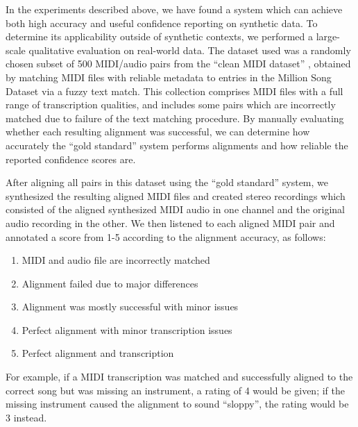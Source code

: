 \documentclass{article}
\begin{document}
In the experiments described above, we have found a system which can achieve both high accuracy and useful confidence reporting on synthetic data.
To determine its applicability outside of synthetic contexts, we performed a large-scale qualitative evaluation on real-world data.
The dataset used was a randomly chosen subset of 500 MIDI/audio pairs from the ``clean MIDI dataset'' \cite{raffel2015large}, obtained by matching MIDI files with reliable metadata to entries in the Million Song Dataset \cite{bertin2011million} via a fuzzy text match.
This collection comprises MIDI files with a full range of transcription qualities, and includes some pairs which are incorrectly matched due to failure of the text matching procedure.
By manually evaluating whether each resulting alignment was successful, we can determine how accurately the ``gold standard'' system performs alignments and how reliable the reported confidence scores are.

After aligning all pairs in this dataset using the ``gold standard'' system, we synthesized the resulting aligned MIDI files and created stereo recordings which consisted of the aligned synthesized MIDI audio in one channel and the original audio recording in the other.
We then listened to each aligned MIDI pair and annotated a score from 1-5 according to the alignment accuracy, as follows:
\begin{enumerate}[topsep=1pt,itemsep=-1pt]
\item MIDI and audio file are incorrectly matched
\item Alignment failed due to major differences
\item Alignment was mostly successful with minor issues
\item Perfect alignment with minor transcription issues
\item Perfect alignment and transcription
\end{enumerate}
For example, if a MIDI transcription was matched and successfully aligned to the correct song but was missing an instrument, a rating of 4 would be given; if the missing instrument caused the alignment to sound ``sloppy'', the rating would be 3 instead.
\end{document}
